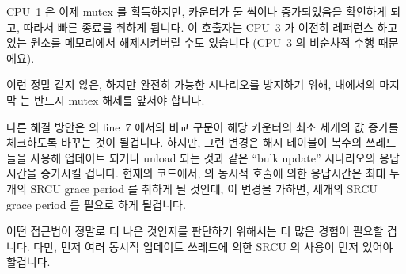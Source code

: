 {	CPU~1 은 이제 mutex 를 획득하지만,  카운터가 둘
	씩이나 증가되었음을 확인하게 되고, 따라서 빠른 종료를 취하게 됩니다.
	이 호출자는 CPU~3 가 여전히 레퍼런스 하고 있는 원소를 메모리에서
	해제시켜버릴 수도 있습니다 (CPU~3 의 비순차적 수행 때문에요).

	이런 정말 같지 않은, 하지만 완전히 가능한 시나리오를 방지하기 위해,
	 내에서의 마지막  는
	반드시 mutex 해제를 앞서야 합니다.

	다른 해결 방안은  의 line~7 에서의 비교 구문이
	해당 카운터의 최소 세개의 값 증가를 체크하도록 바꾸는 것이 될겁니다.
	하지만, 그런 변경은 해시 테이블이 복수의 쓰레드들을 사용해 업데이트
	되거나 unload 되는 것과 같은 ``bulk update'' 시나리오의 응답시간을
	증가시킬 겁니다.
	현재의 코드에서,  의 동시적 호출에 의한
	응답시간은 최대 두개의 SRCU grace period 를 취하게 될 것인데, 이 변경을
	가하면, 세개의 SRCU grace period 를 필요로 하게 될겁니다.

	어떤 접근법이 정말로 더 나은 것인지를 판단하기 위해서는 더 많은 경험이
	필요할 겁니다.
	다만, 먼저 여러 동시적 업데이트 쓰레드에 의한 SRCU 의 사용이 먼저
	있어야 할겁니다.

} \QuickQuizEnd

